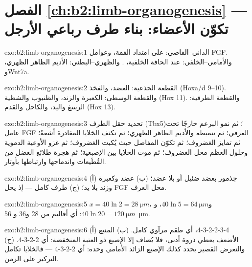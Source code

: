 \section*{الفصل \ref{ch:b2:limb-organogenesis} --- تكوّن الأعضاء: بناء طرف رباعي الأرجل}

\begin{solution}{exo:b2:limb-organogenesis:1}
الداني--القاصي:  على امتداد القمة، وعوامل FGF.
والأمامي--الخلفي:  عند الحافة الخلفية،
. والظهري--البطني: الأديم الظاهر الظهري، وWnt7a.
\end{solution}

\begin{solution}{exo:b2:limb-organogenesis:2}
القطعة الجذعية: العضد، والفخذ (Hoxa/d 9--10). والقطعة الوسطى: الكعبرة والزند،
والظنبوب والشظية (Hox 11). والقطعة الطرفية: الرسغ واليد، والكاحل والقدم
(Hox 13).
\end{solution}

\begin{solution}{exo:b2:limb-organogenesis:3}
تحديد حقل الطرف (Tbx5)؛ ثم نمو البرعم خارجًا تحت عامل FGF العرفي؛
ثم تنميطه  والأديم الظاهر الظهري؛ ثم تكثف الخلايا
المغادرة  أشعةً؛ ثم تمايز الغضروف؛ ثم تكوّن المفاصل
حيث يُكبت الغضروف؛ ثم غزو الأوعية الدموية وحلول العظم
محل الغضروف؛ ثم موت الخلايا بين الإصبعية؛ ثم هجرة طلائع العضل من
القُطَيعات واندماجها وارتباطها بأوتار.
\end{solution}

\begin{solution}{exo:b2:limb-organogenesis:4}
(أ) جذمور بعضد ضئيل أو بلا عضد؛ (ب) عضد وكعبرة وزند
بلا يد؛ (ج) طرف كامل --- إذ يحل FGF محل العرف.
\end{solution}

\begin{solution}{exo:b2:limb-organogenesis:5}
$x = 40\ln 2 = \qty{28}{\micro m}$، و$40\ln 5 = \qty{64}{\micro m}$،
و$40\ln 20 = \qty{120}{\micro m}$: أي أقاليم من 28 و36 و
\qty{56}{\micro m}.
\end{solution}

\begin{solution}{exo:b2:limb-organogenesis:6}
(أ) 4-3-2-2-3-4، أي طقم مرآوي كامل. (ب) المنبع الأضعف يعطي
ذروة أدنى، فلا يُضاف إلا الإصبع ذو العتبة المنخفضة: أي 2-2-3-4. (ج)
والتعرض القصير يحدد كذلك الإصبع الزائد الأمامي وحده:
أي 2-2-3-4 --- فالخلايا تكامل التركيز على الزمن.
\end{solution}

